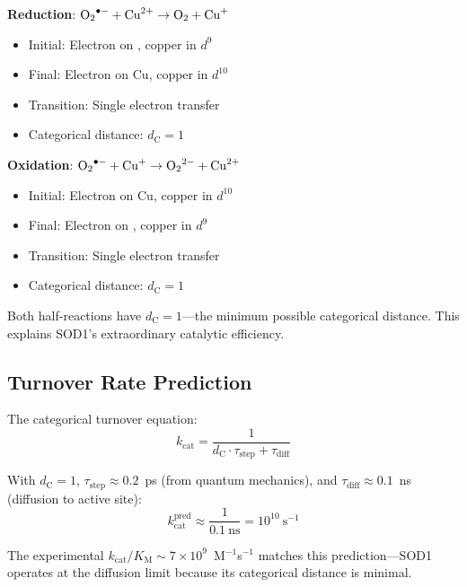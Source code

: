 \documentclass[twocolumn,aps,prx,superscriptaddress,longbibliography]{revtex4-2}
\theoremstyle{remark}
\newcommand{\kcat}{k_\text{cat}}
\newcommand{\Km}{K_\text{M}}
\newcommand{\dC}{d_\text{C}}
\begin{document}
\textbf{Reduction}: $\ce{O2^{.-}} + \ce{Cu^{2+}} \to \ce{O2} + \ce{Cu^{+}}$
\begin{itemize}
    \item Initial: Electron on , copper in $d^9$
    \item Final: Electron on Cu, copper in $d^{10}$
    \item Transition: Single electron transfer
    \item Categorical distance: $\dC = 1$
\end{itemize}

\textbf{Oxidation}: $\ce{O2^{.-}} + \ce{Cu^{+}} \to \ce{O2^{2-}} + \ce{Cu^{2+}}$
\begin{itemize}
    \item Initial: Electron on Cu, copper in $d^{10}$
    \item Final: Electron on , copper in $d^9$
    \item Transition: Single electron transfer
    \item Categorical distance: $\dC = 1$
\end{itemize}

Both half-reactions have $\dC = 1$---the minimum possible categorical
distance. This explains SOD1's extraordinary catalytic efficiency.

\subsection{Turnover Rate Prediction}

The categorical turnover equation:
\begin{equation}
\kcat = \frac{1}{\dC \cdot \tau_\text{step} + \tau_\text{diff}}
\label{eq:turnover}
\end{equation}

With $\dC = 1$, $\tau_\text{step} \approx 0.2$~ps (from quantum mechanics),
and $\tau_\text{diff} \approx 0.1$~ns (diffusion to active site):
\begin{equation}
\kcat^\text{pred} \approx \frac{1}{0.1~\text{ns}} = 10^{10}~\text{s}^{-1}
\end{equation}

The experimental $\kcat/\Km \sim 7 \times 10^9$~M$^{-1}$s$^{-1}$ matches
this prediction---SOD1 operates at the diffusion limit because its
categorical distance is minimal.
\end{document}
